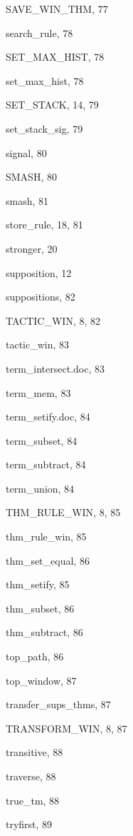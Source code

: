 \begin{theindex}
  \indexspace

  \item {\ptt SAVE\_WIN\_THM}, 77
  \item {\ptt search\_rule}, 78
  \item {\ptt SET\_MAX\_HIST}, 78
  \item {\ptt set\_max\_hist}, 78
  \item {\ptt SET\_STACK}, 14, 79
  \item {\ptt set\_stack\_sig}, 79
  \item {\ptt signal}, 80
  \item {\ptt SMASH}, 80
  \item {\ptt smash}, 81
  \item {\ptt store\_rule}, 18, 81
  \item stronger, 20
  \item supposition, 12
  \item {\ptt suppositions}, 82

  \indexspace

  \item {\ptt TACTIC\_WIN}, 8, 82
  \item {\ptt tactic\_win}, 83
  \item {\ptt term\_intersect.doc}, 83
  \item {\ptt term\_mem}, 83
  \item {\ptt term\_setify.doc}, 84
  \item {\ptt term\_subset}, 84
  \item {\ptt term\_subtract}, 84
  \item {\ptt term\_union}, 84
  \item {\ptt THM\_RULE\_WIN}, 8, 85
  \item {\ptt thm\_rule\_win}, 85
  \item {\ptt thm\_set\_equal}, 86
  \item {\ptt thm\_setify}, 85
  \item {\ptt thm\_subset}, 86
  \item {\ptt thm\_subtract}, 86
  \item {\ptt top\_path}, 86
  \item {\ptt top\_window}, 87
  \item {\ptt transfer\_sups\_thms}, 87
  \item {\ptt TRANSFORM\_WIN}, 8, 87
  \item {\ptt transitive}, 88
  \item {\ptt traverse}, 88
  \item {\ptt true\_tm}, 88
  \item {\ptt tryfirst}, 89


\end{theindex}

